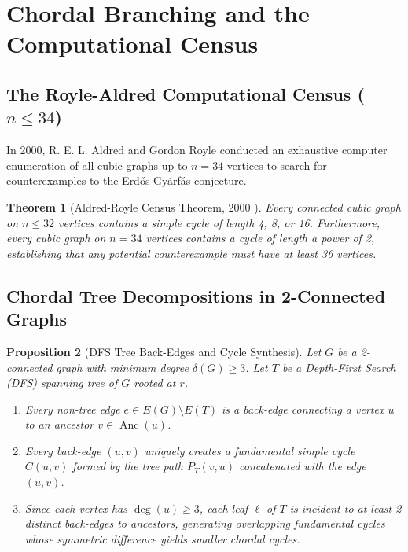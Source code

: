 \documentclass[11pt,a4paper]{article}
\newtheorem{theorem}{Theorem}[section]
\newtheorem{proposition}[theorem]{Proposition}
\theoremstyle{definition}
\begin{document}
\section{Chordal Branching and the Computational Census}

\subsection{The Royle-Aldred Computational Census ($n \le 34$)}
In 2000, R. E. L. Aldred and Gordon Royle \cite{royle2000} conducted an exhaustive computer enumeration of all cubic graphs up to $n = 34$ vertices to search for counterexamples to the Erd\H{o}s-Gy\'arf\'as conjecture.

\begin{theorem}[Aldred-Royle Census Theorem, 2000 \cite{royle2000}]\label{thm:census}
Every connected cubic graph on $n \le 32$ vertices contains a simple cycle of length 4, 8, or 16. Furthermore, every cubic graph on $n = 34$ vertices contains a cycle of length a power of 2, establishing that any potential counterexample must have at least 36 vertices.
\end{theorem}

\subsection{Chordal Tree Decompositions in 2-Connected Graphs}

\begin{proposition}[DFS Tree Back-Edges and Cycle Synthesis]\label{prop:dfs_chords}
Let $G$ be a 2-connected graph with minimum degree $\delta(G) \ge 3$. Let $T$ be a Depth-First Search (DFS) spanning tree of $G$ rooted at $r$.
\begin{enumerate}
    \item Every non-tree edge $e \in E(G) \setminus E(T)$ is a back-edge connecting a vertex $u$ to an ancestor $v \in \operatorname{Anc}(u)$.
    \item Every back-edge $(u, v)$ uniquely creates a fundamental simple cycle $C(u, v)$ formed by the tree path $P_T(v, u)$ concatenated with the edge $(u, v)$.
    \item Since each vertex has $\deg(u) \ge 3$, each leaf $\ell$ of $T$ is incident to at least 2 distinct back-edges to ancestors, generating overlapping fundamental cycles whose symmetric difference yields smaller chordal cycles.
\end{enumerate}
\end{proposition}
\end{document}
